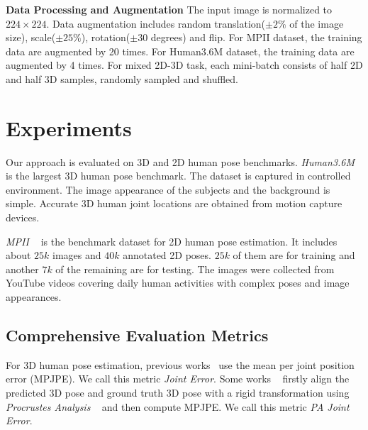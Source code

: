 \documentclass[10pt,twocolumn,letterpaper]{article}
\begin{document}
\textbf{Data Processing and Augmentation} The input image is normalized to $224\times224$. Data augmentation includes random translation($\pm2\%$ of the image size), scale($\pm25\%$), rotation($\pm30$ degrees) and flip. For MPII dataset, the training data are augmented by 20 times. For Human3.6M dataset, the training data are augmented by 4 times. For mixed 2D-3D task, each mini-batch consists of half 2D and half 3D samples, randomly sampled and shuffled.

\begin{comment}
\begin{figure*}[htbb]
  \centering
   \includegraphics [width=0.95\linewidth] {figure/2d_3d_train.pdf}
    \caption{Combine 2D and 3D samples}
    \label{fig.2d_3d_train}
\end{figure*}
\end{comment}

\section{Experiments}
\label{sec.exp}

Our approach is evaluated on 3D and 2D human pose benchmarks. \emph{Human3.6M~\cite{ionescu2014human3}} is the largest 3D human pose benchmark. The dataset is captured in controlled environment. The image appearance of the subjects and the background is simple. Accurate 3D human joint locations are obtained from motion capture devices.


\emph{MPII ~\cite{andriluka20142d}} is the benchmark dataset for 2D human pose estimation. It includes about $25k$ images and $40k$ annotated 2D poses. $25k$ of them are for training and another $7k$ of the remaining are for testing. The images were collected from YouTube videos covering daily human activities with complex poses and image appearances.

\subsection{Comprehensive Evaluation Metrics}

For 3D human pose estimation, previous works~\cite{chen20163d, tome2017lifting, moreno20163d, zhou2017monocap, jahangiri2017generating, mehta2016monocular, pavlakos2016coarse, yasin2016dual, rogez2016mocap, bogo2016keep, zhou2016sparseness, tekin2016direct, zhou2016deep} use the mean per joint position error (MPJPE). We call this metric \emph{Joint Error}. Some works ~\cite{yasin2016dual, rogez2016mocap, chen20163d, bogo2016keep, moreno20163d, zhou2017monocap} firstly align the predicted 3D pose and ground truth 3D pose with a rigid transformation using \emph{Procrustes Analysis} ~\cite{gower1975generalized} and then compute MPJPE. We call this metric \emph{PA Joint Error}.
\end{document}

